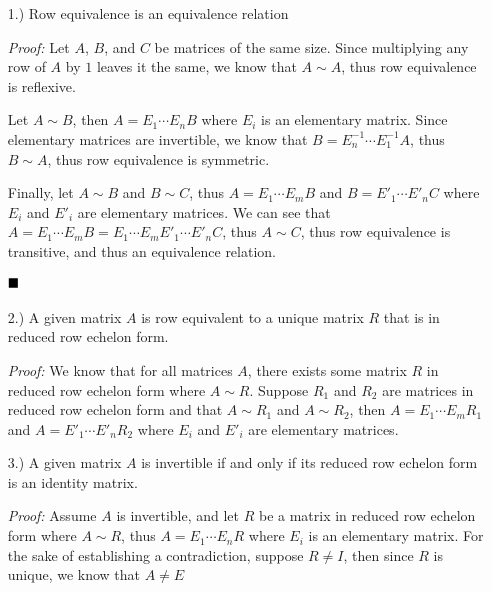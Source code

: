 \documentclass[12pt]{article}
\newcommand{\done}{
    \ensuremath{\strut\hfill\blacksquare}
}
\begin{document}
    \begin{itemize}
        \item [1.)] Row equivalence is an equivalence relation
        
        \textit{Proof:} Let $A$, $B$, and $C$ be matrices of the same size.
        Since multiplying any row of $A$ by $1$ leaves it the same, we know
        that $A\sim A$, thus row equivalence is reflexive.

        Let $A\sim B$, then $A=E_1\cdots E_nB$ where $E_i$ is an elementary
        matrix.
        Since elementary matrices are invertible, we know that
        $B=E^{-1}_n\cdots E^{-1}_1A$, thus $B\sim A$, thus row equivalence
        is symmetric.

        Finally, let $A\sim B$ and $B\sim C$, thus $A=E_1\cdots E_mB$ and
        $B=E'_1\cdots E'_nC$ where $E_i$ and $E'_i$ are elementary matrices.
        We can see that $A=E_1\cdots E_mB=E_1\cdots E_mE'_1\cdots E'_nC$, thus
        $A\sim C$, thus row equivalence is transitive, and thus an equivalence
        relation.
        \done

        \item [2.)] A given matrix $A$ is row equivalent to a unique matrix
        $R$ that is in reduced row echelon form.

        \textit{Proof:} We know that for all matrices $A$, there exists some
        matrix $R$ in reduced row echelon form where $A \sim R$.
        Suppose $R_1$ and $R_2$ are matrices in reduced row echelon form
        and that $A \sim R_1$ and $A \sim R_2$, then $A = E_1 \cdots E_mR_1$ and
        $A=E'_1 \cdots E'_nR_2$ where $E_i$ and $E'_i$ are elementary matrices.


        \item [3.)] A given matrix $A$ is invertible if and only if its
        reduced row echelon form is an identity matrix.

        \textit{Proof:} Assume $A$ is invertible, and let $R$ be a matrix in
        reduced row echelon form where $A \sim R$, thus $A = E_1 \cdots E_nR$
        where $E_i$ is an elementary matrix. For the sake of establishing a
        contradiction, suppose $R \ne I$, then since $R$ is unique, we know
        that $A\ne E$

    \end{itemize}
    
\end{document}
